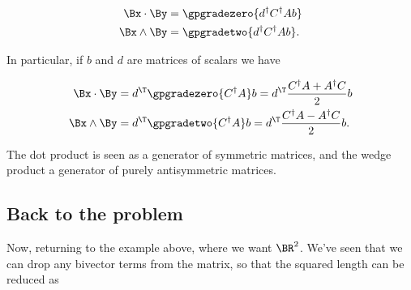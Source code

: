 \begin{align}\label{eqn:matrixVectorPotentials:n}
\Bx \cdot \By &= \gpgradezero{ d^\dagger C^\dagger A b } \\
\Bx \wedge \By &= \gpgradetwo{ d^\dagger C^\dagger A b }.
\end{align}

In particular, if $b$ and $d$ are matrices of scalars we have

\begin{align}\label{eqn:matrixVectorPotentials:n}
\Bx \cdot \By &= d^\T \gpgradezero{C^\dagger A} b = d^\T \frac{C^\dagger A + A^\dagger C}{2} b \\
\Bx \wedge \By &= d^\T \gpgradetwo{C^\dagger A} b = d^\T \frac{C^\dagger A - A^\dagger C}{2} b.
\end{align}

The dot product is seen as a generator of symmetric matrices, and the wedge product a generator of purely antisymmetric matrices.

\subsection{Back to the problem}

Now, returning to the example above, where we want $\BR^2$.  We've seen that we can drop any bivector terms from the matrix, so that the squared length can be reduced as

